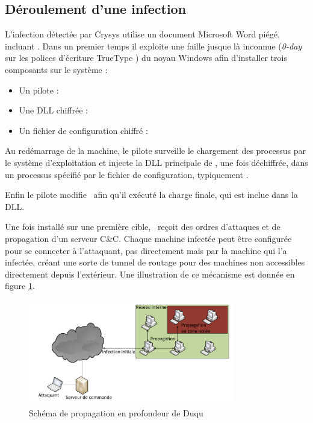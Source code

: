 \subsection{Déroulement d'une infection}
L'infection détectée par Crysys utilise un document Microsoft Word piégé, incluant \duqu.
Dans un premier temps il exploite une faille jusque là inconnue (\emph{0-day} sur les polices d'écriture TrueType \cite{CVETrueType}) du noyau Windows afin d'installer trois composants sur le système :
\begin{itemize}
 \item Un pilote : \driver
 \item Une DLL chiffrée : \netpDLL
 \item Un fichier de configuration chiffré : \netpCONF
\end{itemize}

Au redémarrage de la machine, le pilote surveille le chargement des processus par le système d'exploitation et injecte la DLL principale de \duqu, une fois déchiffrée, dans un processus spécifié par le fichier de configuration, typiquement \services.

Enfin le pilote modifie \services\ afin qu'il exécuté la charge finale, qui est inclue dans la DLL.

Une fois installé sur une première cible, \duqu\ reçoit des ordres d'attaques et de propagation d'un serveur C\&C.
Chaque machine infectée peut être configurée pour se connecter à l'attaquant, pas directement mais par la machine qui l'a infectée, créant une sorte de tunnel de routage pour des machines non accessibles directement depuis l'extérieur. Une illustration de ce mécanisme est donnée en figure \ref{fig:propagationDuqu}.

\begin{figure}[h]
\begin{center}
 \includegraphics[width=0.8\textwidth]{supports/duqu/propagationDuqu.pdf}
\end{center}
\caption{Schéma de propagation en profondeur de Duqu}
\label{fig:propagationDuqu}
\end{figure}

